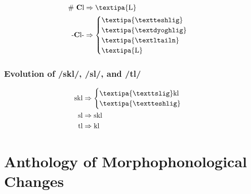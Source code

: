 \documentclass{report}
\begin{document}
\begin{align}
  \#\ \textbf{C}\text{l} & \Rightarrow \text{\textipa{L}} \\
  \text{-}\textbf{C}\text{l-} & \Rightarrow \begin{cases}
                                              \text{\textipa{\textteshlig}} \\
                                              \text{\textipa{\textdyoghlig}} \\
                                              \text{\textipa{\textltailn}} \\
                                              \text{\textipa{L}}
                                            \end{cases}
\end{align}

\subsection{Evolution of /skl/, /sl/, and /tl/}

\begin{align}
  \text{skl} & \Rightarrow \begin{cases}
                             \text{\textipa{\texttslig}kl} \\
                             \text{\textipa{\textteshlig}}
                           \end{cases}\\
  \text{sl} & \Rightarrow \text{skl} \\
  \text{tl} & \Rightarrow \text{kl}
\end{align}

\chapter{Anthology of Morphophonological Changes}

\nocite{*}

\printbibliography
\end{document}
